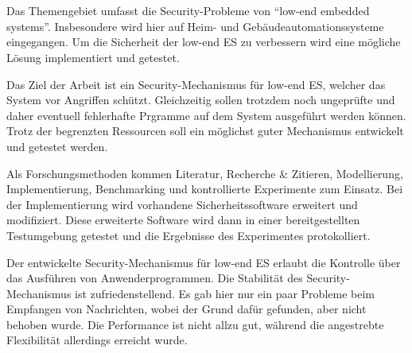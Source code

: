 
%
\section*{\thesisheading} %



 Das Themengebiet umfasst die Security-Probleme von \enquote{low-end embedded systems}. 
Insbesondere wird hier auf Heim- und Gebäudeautomationssysteme eingegangen. Um die Sicherheit der low-end ES zu 
verbessern wird eine mögliche Lösung implementiert und getestet.

 Das Ziel der Arbeit ist ein Security-Mechanismus für low-end ES, welcher das System 
vor Angriffen schützt. Gleichzeitig sollen trotzdem noch ungeprüfte und daher eventuell fehlerhafte Prgramme 
auf dem System ausgeführt werden können. Trotz der begrenzten Ressourcen soll ein möglichst guter Mechanismus 
entwickelt und getestet werden.

 Als Forschungsmethoden kommen Literatur, Recherche \& Zitieren, Modellierung, 
Implementierung, Benchmarking und kontrollierte Experimente zum Einsatz. Bei der Implementierung wird vorhandene
Sicherheitssoftware erweitert und modifiziert. Diese erweiterte Software wird dann in einer bereitgestellten Testumgebung
getestet und die Ergebnisse des Experimentes protokolliert.

 Der entwickelte Security-Mechanismus für low-end ES erlaubt die Kontrolle über das Ausführen von
Anwenderprogrammen. Die Stabilität des Security-Mechanismus ist zufriedenstellend. Es gab hier nur ein paar Probleme beim
Empfangen von Nachrichten, wobei der Grund dafür gefunden, aber nicht behoben wurde. Die Performance ist nicht allzu gut,
während die angestrebte Flexibilität allerdings erreicht wurde.


%
\section*{\thesisheading} %


